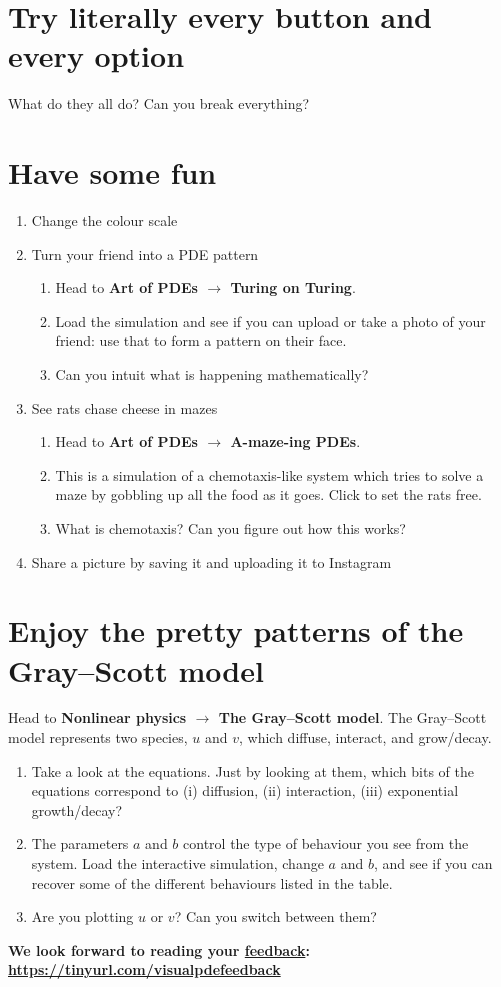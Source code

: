 \documentclass[a4paper,10pt]{article}
\begin{document}
\section{Try literally every button and every option}
What do they all do? Can you break everything?

\section{Have some fun}
\begin{enumerate}[label=(\alph*)]
    \item Change the colour scale
    \item Turn your friend into a PDE pattern
    \begin{enumerate}[label=(\roman*)]
        \item Head to \textbf{Art of PDEs $\to$ Turing on Turing}.
        \item Load the simulation and see if you can upload or take a photo of your friend: use that to form a pattern on their face.
        \item Can you intuit what is happening mathematically?
    \end{enumerate}
    \item See rats chase cheese in mazes
    \begin{enumerate}[label=(\roman*)]
        \item Head to \textbf{Art of PDEs $\to$ A-maze-ing PDEs}.
        \item This is a simulation of a chemotaxis-like system which tries to solve a maze by gobbling up all the food as it goes. Click to set the rats free.
        \item What is chemotaxis? Can you figure out how this works?
    \end{enumerate}
    \item Share a picture by saving it and uploading it to Instagram
\end{enumerate}

\section{Enjoy the pretty patterns of the Gray--Scott model}
Head to \textbf{Nonlinear physics $\to$ The Gray–Scott model}. The Gray--Scott model represents two species, $u$ and $v$, which diffuse, interact, and grow/decay.
\begin{enumerate}[label=(\alph*)]
    \item Take a look at the equations. Just by looking at them, which bits of the equations correspond to (i) diffusion, (ii) interaction, (iii) exponential growth/decay?
    \item The parameters $a$ and $b$ control the type of behaviour you see from the system. Load the interactive simulation, change $a$ and $b$, and see if you can recover some of the different behaviours listed in the table.
    \item Are you plotting $u$ or $v$? Can you switch between them?
\end{enumerate}

\textbf{We look forward to reading your {\href{https://forms.gle/CYzoiCzZsYKsDh778}{feedback}}: \uline{https://tinyurl.com/visualpdefeedback}}
\end{document}
